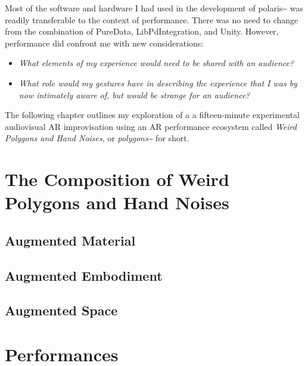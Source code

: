 Most of the software and hardware I had used in the development of polaris\textasciitilde{} was readily transferable to the context of performance. There was no need to change from the combination of PureData, LibPdIntegration, and Unity. However, performance did confront me with new considerations: 
\begin{itemize}
    \item \textit{What elements of my experience would need to be shared with an audience?} 
    \item \textit{What role would my gestures have in describing the experience that I was by now intimately aware of, but would be strange for an audience?} 
\end{itemize}
The following chapter outlines my exploration of a a fifteen-minute experimental audiovisual AR improvisation using an AR performance ecosystem called \textit{Weird Polygons and Hand Noises}, or \textit{polygons\textasciitilde{}} for short.



\section{The Composition of Weird Polygons and Hand Noises} \label{sec: polygons-composition}
\subsection{Augmented Material} \label{sec: polygons-composition-material}

\subsection{Augmented Embodiment} \label{sec: polygons-composition-embodiment}

\subsection{Augmented Space} \label{sec: polygons-composition-space}



\section{Performances} \label{sec: polygons-performances}
